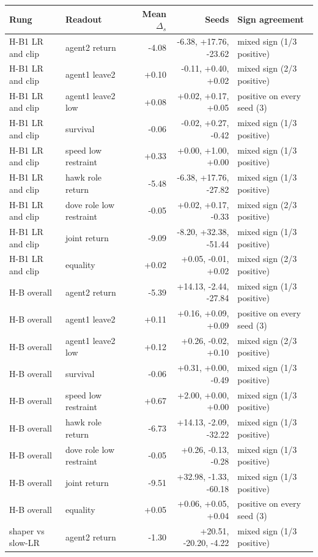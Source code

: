 \begin{tabular}{llrrl}
\toprule
Rung & Readout & Mean $\Delta_s$ & Seeds & Sign agreement \\
\midrule
H-B1 LR and clip & agent2 return & -4.08 & -6.38, +17.76, -23.62 & mixed sign (1/3 positive) \\
H-B1 LR and clip & agent1 leave2 & +0.10 & -0.11, +0.40, +0.02 & mixed sign (2/3 positive) \\
H-B1 LR and clip & agent1 leave2 low & +0.08 & +0.02, +0.17, +0.05 & positive on every seed (3) \\
H-B1 LR and clip & survival & -0.06 & -0.02, +0.27, -0.42 & mixed sign (1/3 positive) \\
H-B1 LR and clip & speed low restraint & +0.33 & +0.00, +1.00, +0.00 & mixed sign (1/3 positive) \\
H-B1 LR and clip & hawk role return & -5.48 & -6.38, +17.76, -27.82 & mixed sign (1/3 positive) \\
H-B1 LR and clip & dove role low restraint & -0.05 & +0.02, +0.17, -0.33 & mixed sign (2/3 positive) \\
H-B1 LR and clip & joint return & -9.09 & -8.20, +32.38, -51.44 & mixed sign (1/3 positive) \\
H-B1 LR and clip & equality & +0.02 & +0.05, -0.01, +0.02 & mixed sign (2/3 positive) \\
H-B overall & agent2 return & -5.39 & +14.13, -2.44, -27.84 & mixed sign (1/3 positive) \\
H-B overall & agent1 leave2 & +0.11 & +0.16, +0.09, +0.09 & positive on every seed (3) \\
H-B overall & agent1 leave2 low & +0.12 & +0.26, -0.02, +0.10 & mixed sign (2/3 positive) \\
H-B overall & survival & -0.06 & +0.31, +0.00, -0.49 & mixed sign (1/3 positive) \\
H-B overall & speed low restraint & +0.67 & +2.00, +0.00, +0.00 & mixed sign (1/3 positive) \\
H-B overall & hawk role return & -6.73 & +14.13, -2.09, -32.22 & mixed sign (1/3 positive) \\
H-B overall & dove role low restraint & -0.05 & +0.26, -0.13, -0.28 & mixed sign (1/3 positive) \\
H-B overall & joint return & -9.51 & +32.98, -1.33, -60.18 & mixed sign (1/3 positive) \\
H-B overall & equality & +0.05 & +0.06, +0.05, +0.04 & positive on every seed (3) \\
shaper vs slow-LR & agent2 return & -1.30 & +20.51, -20.20, -4.22 & mixed sign (1/3 positive) \\

\end{tabular}

